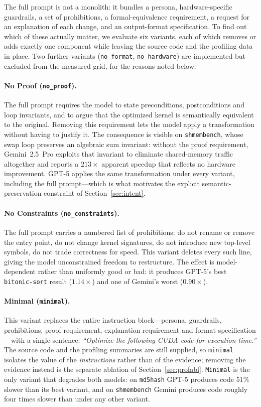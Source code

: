 The full prompt is not a monolith: it bundles a persona, hardware-specific guardrails, a set of
prohibitions, a formal-equivalence requirement, a request for an explanation of each change, and an
output-format specification. To find out which of these actually matter, we evaluate six variants, each
of which removes or adds exactly one component while leaving the source code and the profiling data
in place. Two further variants (\texttt{no\_format}, \texttt{no\_hardware}) are implemented but excluded
from the measured grid, for the reasons noted below.

\paragraph{No Proof (\texttt{no\_proof}).}
The full prompt requires the model to state preconditions, postconditions and loop invariants, and to
argue that the optimized kernel is semantically equivalent to the original. Removing this requirement
lets the model apply a transformation without having to justify it. The consequence is visible on
\texttt{shmembench}, whose swap loop preserves an algebraic sum invariant: without the proof
requirement, Gemini~2.5~Pro exploits that invariant to eliminate shared-memory traffic altogether and
reports a $213\times$ apparent speedup that reflects no hardware improvement. GPT-5 applies the same
transformation under every variant, including the full prompt---which is what motivates the explicit
semantic-preservation constraint of Section~\ref{sec:intent}.

\paragraph{No Constraints (\texttt{no\_constraints}).}
The full prompt carries a numbered list of prohibitions: do not rename or remove the entry point, do
not change kernel signatures, do not introduce new top-level symbols, do not trade correctness for
speed. This variant deletes every such line, giving the model unconstrained freedom to restructure.
The effect is model-dependent rather than uniformly good or bad: it produces GPT-5's best
\texttt{bitonic-sort} result ($1.14\times$) and one of Gemini's worst ($0.90\times$).

\paragraph{Minimal (\texttt{minimal}).}
This variant replaces the entire instruction block---persona, guardrails, prohibitions, proof
requirement, explanation requirement and format specification---with a single sentence:
\textit{``Optimize the following CUDA code for execution time.''} The source code and the profiling
summaries are still supplied, so \texttt{minimal} isolates the value of the \emph{instructions} rather
than of the evidence; removing the evidence instead is the separate ablation of
Section~\ref{sec:profabl}. \texttt{Minimal} is the only variant that degrades both models: on
\texttt{md5hash} GPT-5 produces code $51\%$ slower than its best variant, and on \texttt{shmembench}
Gemini produces code roughly four times slower than under any other variant.

